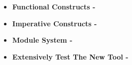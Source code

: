 \begin{itemize}

\item \textbf{Functional Constructs -}

\item \textbf{Imperative Constructs -}

\item \textbf{Module System -}

\item \textbf{Extensively Test The New Tool -}








\end{itemize}
